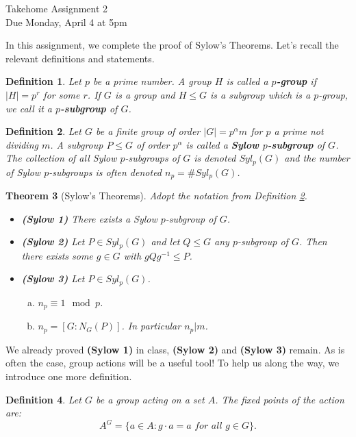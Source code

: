 \documentclass[11pt]{article}
\newtheorem{theorem}{Theorem}
\newtheorem{definition}[theorem]{Definition}
\begin{document}
\begin{center}
\Large {Takehome Assignment 2}\\
\small {Due Monday, April 4 at 5pm}
\end{center}
In this assignment, we complete the proof of Sylow's Theorems.  Let's recall the relevant definitions and statements.
\begin{definition}
Let $p$ be a prime number.  A group $H$ is called a \textbf{$p$-group} if $|H| = p^r$ for some $r$.  If $G$ is a group and $H\le G$ is a subgroup which is a $p$-group, we call it a \textbf{$p$-subgroup} of $G$.
\end{definition}
\begin{definition}\label{maindef}
Let $G$ be a finite group of order $|G| = p^\alpha m$ for $p$ a prime not dividing $m$.  A subgroup $P\le G$ of order $p^\alpha$ is called a \textbf{Sylow $p$-subgroup} of $G$.  The collection of all Sylow $p$-subgroups of $G$ is denoted $Syl_p(G)$ and the number of Sylow $p$-subgroups is often denoted $n_p = \#Syl_p(G)$.
\end{definition}
\begin{theorem}[Sylow's Theorems]
Adopt the notation from Definition \ref{maindef}.
\begin{itemize}
\item{
\textbf{(Sylow 1)} There exists a Sylow $p$-subgroup of $G$.
}
\item{
\textbf{(Sylow 2)} Let $P\in Syl_p(G)$ and let $Q\le G$ any $p$-subgroup of $G$.  Then there exists some $g\in G$ with $gQg^{-1}\le P$.
}
\item{
\textbf{(Sylow 3)} Let $P\in Syl_p(G)$.
\begin{enumerate}[(a)]
\item $n_p\equiv 1\mod p$.
\item $n_p = [G:N_G(P)]$.  In particular $n_p|m$.
\end{enumerate}
}
\end{itemize}
\end{theorem}
We already proved \textbf{(Sylow 1)} in class, \textbf{(Sylow 2)} and \textbf{(Sylow 3)} remain.  As is often the case, group actions will be a useful tool!  To help us along the way, we introduce one more definition.
\begin{definition}
Let $G$ be a group acting on a set $A$.  The fixed points of the action are:
\[A^G = \{a\in A:g\cdot a = a\textit{ for all }g\in G\}.\]
\end{definition}
\end{document}
